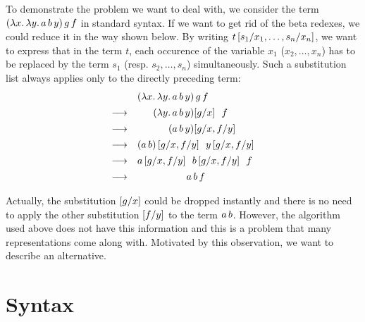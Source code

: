\documentclass[submission,copyright,creativecommons]{eptcs}
\begin{document}
To demonstrate the problem we want to deal with, we consider the term $(\lambda {x}. \, \lambda {y}. \, a \, b \, y) \, g \, f$ in standard syntax. 
If we want to get rid of the beta redexes, we could reduce it in the way shown below. By writing $t\left[ s_1 / x_1 , \ldots, s_n / x_n \right]$, we want to express that in the term $t$, each occurence of the variable $x_1$ ($x_2, \ldots, x_n$) has to be replaced by the term $s_1$ (resp. $s_2, \ldots, s_n$) simultaneously. Such a substitution list always applies only to the directly preceding term:
\[
\begin{array}{lr@{}l}
\shspace &(\LaA x {\LaA y {\ApA{\ApA a b} y}}) & \sspace g \sspace f \\ 
\shspace\re &(\LaA y {\ApA{\ApA a b} y}) & \sub g x \lspace f \\ 
\shspace\re &      (\ApA{\ApA a b} y) & \subs g x f y \\ 
\shspace\re &      \multicolumn 2 l {(a\sspace b)\subs g x f y \lspace y\subs g x f y} \\ 
\shspace\re &      \multicolumn 2 l {a\subs g x f y \lspace b\subs g x f y \lspace f} \\ 
\shspace\re &      \multicolumn 2 {c} {a \sspace b \sspace f}  \\ 
\end{array}
\]
Actually, the substitution $\left[ g / x \right]$ could be dropped instantly and there is no need to apply the other substitution $\left[ f / y \right]$ to the term $a \, b$. However, the algorithm used above does not have this information and this is a problem that many representations come along with. Motivated by this observation, we want to describe an alternative.

\section{Syntax}
\end{document}
